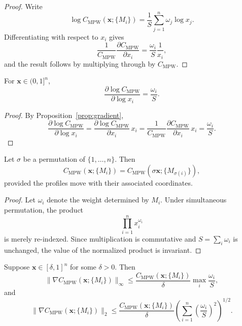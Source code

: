 \documentclass[11pt]{article}
\begin{document}
\begin{proof}
Write
\[
  \log C_{\mathrm{MPW}}(\mathbf{x};\{M_i\})
  = \frac{1}{S}\sum_{j=1}^n \omega_j \log x_j.
\]
Differentiating with respect to $x_i$ gives
\[
  \frac{1}{C_{\mathrm{MPW}}}\frac{\partial C_{\mathrm{MPW}}}{\partial x_i}
  = \frac{\omega_i}{S}\frac{1}{x_i},
\]
and the result follows by multiplying through by $C_{\mathrm{MPW}}$.
\end{proof}

\begin{proposition}
\label{prop:elasticity}
For $\mathbf{x}\in(0,1]^n$,
\[
  \frac{\partial \log C_{\mathrm{MPW}}}{\partial \log x_i}
  = \frac{\omega_i}{S}.
\]
\end{proposition}

\begin{proof}
By Proposition~\ref{prop:gradient},
\[
  \frac{\partial \log C_{\mathrm{MPW}}}{\partial \log x_i}
  =
  \frac{\partial \log C_{\mathrm{MPW}}}{\partial x_i}\,x_i
  =
  \frac{1}{C_{\mathrm{MPW}}}\frac{\partial C_{\mathrm{MPW}}}{\partial x_i}\,x_i
  =
  \frac{\omega_i}{S}.
\]
\end{proof}

\begin{proposition}
\label{prop:equivariance}
Let $\sigma$ be a permutation of $\{1,\dots,n\}$. Then
\[
  C_{\mathrm{MPW}}(\mathbf{x};\{M_i\})
  =
  C_{\mathrm{MPW}}(\sigma\mathbf{x};\{M_{\sigma(i)}\}),
\]
provided the profiles move with their associated coordinates.
\end{proposition}

\begin{proof}
Let $\omega_i$ denote the weight determined by $M_i$. Under simultaneous permutation, the product
\[
  \prod_{i=1}^n x_i^{\omega_i}
\]
is merely re-indexed. Since multiplication is commutative and $S=\sum_i\omega_i$ is unchanged, the value of the normalized product is invariant.
\end{proof}

\begin{proposition}
\label{prop:norm-bounds}
Suppose $\mathbf{x}\in[\delta,1]^n$ for some $\delta>0$. Then
\[
  \|\nabla C_{\mathrm{MPW}}(\mathbf{x};\{M_i\})\|_\infty
  \le \frac{C_{\mathrm{MPW}}(\mathbf{x};\{M_i\})}{\delta}\max_i \frac{\omega_i}{S},
\]
and
\[
  \|\nabla C_{\mathrm{MPW}}(\mathbf{x};\{M_i\})\|_2
  \le \frac{C_{\mathrm{MPW}}(\mathbf{x};\{M_i\})}{\delta}
      \left(\sum_{i=1}^n \left(\frac{\omega_i}{S}\right)^2\right)^{1/2}.
\]
\end{proposition}
\end{document}
